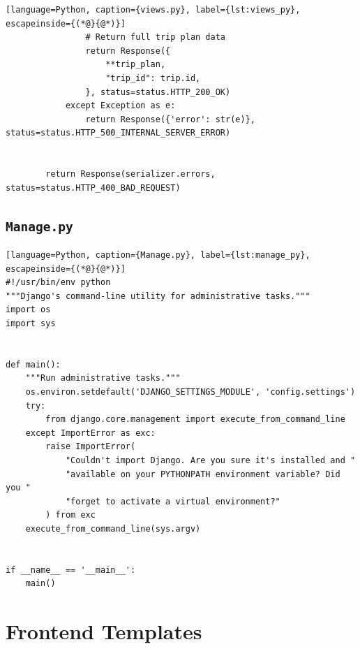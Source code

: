 \begin{lstlisting}[language=Python, caption={views.py}, label={lst:views_py}, escapeinside={(*@}{@*)}]
                # Return full trip plan data
                return Response({
                    **trip_plan,
                    "trip_id": trip.id,
                }, status=status.HTTP_200_OK)
            except Exception as e:
                return Response({'error': str(e)}, status=status.HTTP_500_INTERNAL_SERVER_ERROR)


        return Response(serializer.errors, status=status.HTTP_400_BAD_REQUEST)
\end{lstlisting}


\subsection{\texttt{Manage.py}}
\begin{lstlisting}[language=Python, caption={Manage.py}, label={lst:manage_py}, escapeinside={(*@}{@*)}]
#!/usr/bin/env python
"""Django's command-line utility for administrative tasks."""
import os
import sys


def main():
    """Run administrative tasks."""
    os.environ.setdefault('DJANGO_SETTINGS_MODULE', 'config.settings')
    try:
        from django.core.management import execute_from_command_line
    except ImportError as exc:
        raise ImportError(
            "Couldn't import Django. Are you sure it's installed and "
            "available on your PYTHONPATH environment variable? Did you "
            "forget to activate a virtual environment?"
        ) from exc
    execute_from_command_line(sys.argv)


if __name__ == '__main__':
    main()
\end{lstlisting}


\section{Frontend Templates}


